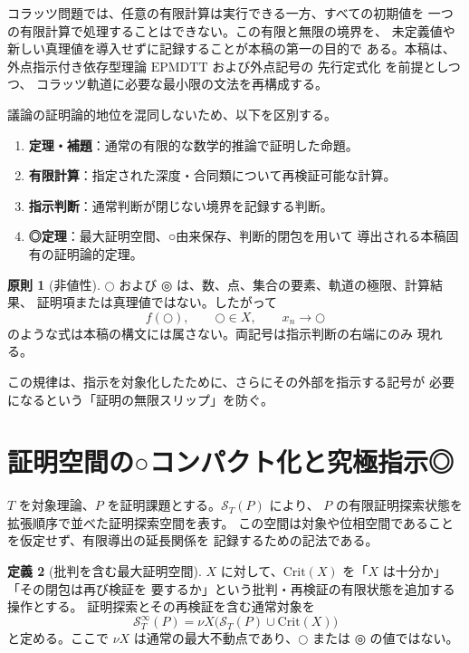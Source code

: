 \documentclass[a4paper,11pt]{ltjsarticle}
\theoremstyle{definition}
\newtheorem{definition}{定義}[section]
\newtheorem{principle}[definition]{原則}
\theoremstyle{plain}
\newcommand{\dfix}{\mathord{\text{○}}}
\newcommand{\udfix}{\mathord{\text{◎}}}
\newcommand{\EPMDTT}{\mathrm{EPMDTT}}
\newcommand{\Crit}{\mathrm{Crit}}
\newcommand{\Sinf}{\mathcal{S}^{\infty}}
\newcommand{\1}{\mathbf{1}}
\begin{document}
コラッツ問題では、任意の有限計算は実行できる一方、すべての初期値を
一つの有限計算で処理することはできない。この有限と無限の境界を、
未定義値や新しい真理値を導入せずに記録することが本稿の第一の目的で
ある。本稿は、外点指示付き依存型理論 $\EPMDTT$ および外点記号の
先行定式化 \cite{ChibaExternal2026,ChibaEPMDTT2026} を前提としつつ、
コラッツ軌道に必要な最小限の文法を再構成する。

議論の証明論的地位を混同しないため、以下を区別する。
\begin{enumerate}
 \item \textbf{定理・補題}：通常の有限的な数学的推論で証明した命題。
 \item \textbf{有限計算}：指定された深度・合同類について再検証可能な計算。
 \item \textbf{指示判断}：通常判断が閉じない境界を記録する判断。
 \item \textbf{◎定理}：最大証明空間、○由来保存、判断的閉包を用いて
       導出される本稿固有の証明論的定理。
\end{enumerate}

\begin{principle}[非値性]
$\dfix$ および $\udfix$ は、数、点、集合の要素、軌道の極限、計算結果、
証明項または真理値ではない。したがって
\[
 f(\dfix),\qquad \dfix\in X,\qquad x_n\longrightarrow\dfix
\]
のような式は本稿の構文には属さない。両記号は指示判断の右端にのみ
現れる。
\end{principle}

この規律は、指示を対象化したために、さらにその外部を指示する記号が
必要になるという「証明の無限スリップ」を防ぐ。

\section{証明空間の○コンパクト化と究極指示◎}

$T$ を対象理論、$P$ を証明課題とする。$\mathcal{S}_T(P)$ により、
$P$ の有限証明探索状態を拡張順序で並べた証明探索空間を表す。
この空間は対象や位相空間であることを仮定せず、有限導出の延長関係を
記録するための記法である。

\begin{definition}[批判を含む最大証明空間]
$X$ に対して、$\Crit(X)$ を「$X$ は十分か」「その閉包は再び検証を
要するか」という批判・再検証の有限状態を追加する操作とする。
証明探索とその再検証を含む通常対象を
\begin{equation}\label{eq:max-proof-space}
 \Sinf_T(P)
 =
 \nu X\bigl(\mathcal{S}_T(P)\cup\Crit(X)\bigr)
\end{equation}
と定める。ここで $\nu X$ は通常の最大不動点であり、$\dfix$ または
$\udfix$ の値ではない。
\end{definition}
\end{document}
